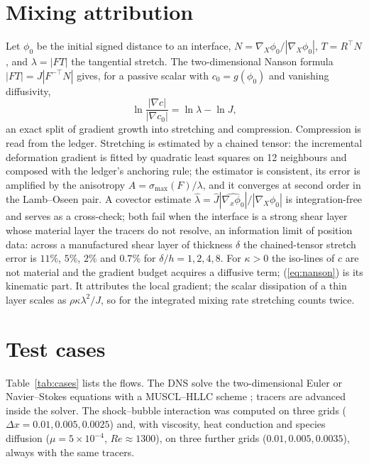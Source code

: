 \documentclass[11pt]{article}
\theoremstyle{definition}\newtheorem{definition}{Definition}\theoremstyle{remark}\newtheorem{remark}{Remark}
\begin{document}
\section{Mixing attribution}\label{sec:mixing}
Let $\phi_0$ be the initial signed distance to an interface, $N=\nabla_X\phi_0/|\nabla_X\phi_0|$, $T=R^\top N$, and $\lambda=|FT|$ the tangential stretch. The two-dimensional Nanson formula $|FT|=J|F^{-\top}N|$ gives, for a passive scalar with $c_0=g(\phi_0)$ and vanishing diffusivity,
\begin{equation}\label{eq:nanson}
\ln\frac{|\nabla c|}{|\nabla c_0|}=\ln\lambda-\ln J,
\end{equation}
an exact split of gradient growth into stretching and compression. Compression is read from the ledger. Stretching is estimated by a chained tensor: the incremental deformation gradient is fitted by quadratic least squares on 12 neighbours and composed with the ledger's anchoring rule; the estimator is consistent, its error is amplified by the anisotropy $A=\sigma_{\max}(F)/\lambda$, and it converges at second order in the Lamb--Oseen pair. A covector estimate $\hat\lambda=\hat J|\widehat{\nabla_x\phi_0}|/|\nabla_X\phi_0|$ is integration-free and serves as a cross-check; both fail when the interface is a strong shear layer whose material layer the tracers do not resolve, an information limit of position data: across a manufactured shear layer of thickness $\delta$ the chained-tensor stretch error is $11\%$, $5\%$, $2\%$ and $0.7\%$ for $\delta/h=1,2,4,8$. For $\kappa>0$ the iso-lines of $c$ are not material and the gradient budget acquires a diffusive term; (\ref{eq:nanson}) is its kinematic part. It attributes the local gradient; the scalar dissipation of a thin layer scales as $\rho\kappa\lambda^2/J$, so for the integrated mixing rate stretching counts twice.

\section{Test cases}
Table~\ref{tab:cases} lists the flows. The DNS solve the two-dimensional Euler or Navier--Stokes equations with a MUSCL--HLLC scheme \citep{Toro1994}; tracers are advanced inside the solver. The shock--bubble interaction was computed on three grids ($\Delta x=0.01,0.005,0.0025$) and, with viscosity, heat conduction and species diffusion ($\mu=5\times10^{-4}$, $Re\approx1300$), on three further grids ($0.01,0.005,0.0035$), always with the same tracers.
\end{document}
